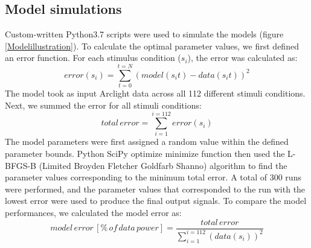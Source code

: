 \documentclass[9pt,lineno]{elife}
\begin{document}
\subsection{Model simulations}
Custom-written Python3.7 scripts were used to simulate the models (figure \ref{Modelillustration}). To calculate the optimal parameter values, we first defined an error function. For each stimulus condition ($s_{i}$), the error was calculated as: 
\begin{equation}
error(s_{i}) = \sum_{t=0}^{t=N} (model (s_{i}t) - data (s_{i}t))^2
\label{error}
\end{equation}
The model took as input Arclight data across all 112 different stimuli conditions. Next, we summed the error for all stimuli conditions: 
\begin{equation}
total\, error = \sum_{i=1}^{i=112} error(s_{i})
\label{totalerror}
\end{equation}
The model parameters were first assigned a random value within the defined parameter bounds. Python SciPy optimize minimize function then used the L-BFGS-B (Limited Broyden Fletcher Goldfarb Shanno) algorithm to find the parameter values corresponding to the minimum total error. A total of 300 runs were performed, and the parameter values that corresponded to the run with the lowest error were used to produce the final output signals. To compare the model performances, we calculated the model error as: 
\begin{equation}
model \, error \, [\% \, of \, data \, power] = \frac{total \, error}{\sum_{i=1}^{i=112}(data(s_{i}))^2} 
\label{modelerror}
\end{equation}

\printbibliography[heading=bibintoc]
\end{document}
